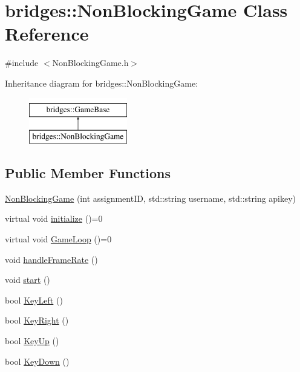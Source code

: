 \hypertarget{classbridges_1_1_non_blocking_game}{}\section{bridges\+::Non\+Blocking\+Game Class Reference}
\label{classbridges_1_1_non_blocking_game}


{\ttfamily \#include $<$Non\+Blocking\+Game.\+h$>$}

Inheritance diagram for bridges\+::Non\+Blocking\+Game\+:\begin{figure}[H]
\begin{center}
\leavevmode
\includegraphics[height=2.000000cm]{classbridges_1_1_non_blocking_game}
\end{center}
\end{figure}
\subsection*{Public Member Functions}
\begin{DoxyCompactItemize}
\item 
\mbox{\hyperlink{classbridges_1_1_non_blocking_game_acf06923b682ad989fb8a8b5ed501f8d6}{Non\+Blocking\+Game}} (int assignment\+ID, std\+::string username, std\+::string apikey)
\item 
virtual void \mbox{\hyperlink{classbridges_1_1_non_blocking_game_aec062ca67d2cb534545a50de504e3aa0}{initialize}} ()=0
\item 
virtual void \mbox{\hyperlink{classbridges_1_1_non_blocking_game_a295adb09973c371cb9821def97a6a416}{Game\+Loop}} ()=0
\item 
void \mbox{\hyperlink{classbridges_1_1_non_blocking_game_a7340c1fef44f929aebf8cd41b94e4d91}{handle\+Frame\+Rate}} ()
\item 
void \mbox{\hyperlink{classbridges_1_1_non_blocking_game_acb77c3a60ec27e422e9da8f479214b55}{start}} ()
\item 
bool \mbox{\hyperlink{classbridges_1_1_non_blocking_game_a03afd28f5d06713b1566a02755f4830f}{Key\+Left}} ()
\item 
bool \mbox{\hyperlink{classbridges_1_1_non_blocking_game_a025324211229593cf024863c59c28475}{Key\+Right}} ()
\item 
bool \mbox{\hyperlink{classbridges_1_1_non_blocking_game_a0afb4ce2d9ef5452e13ecb5ff1c49056}{Key\+Up}} ()
\item 
bool \mbox{\hyperlink{classbridges_1_1_non_blocking_game_a0021645c910404fbc34e1026788d2994}{Key\+Down}} ()
\end{DoxyCompactItemize}
